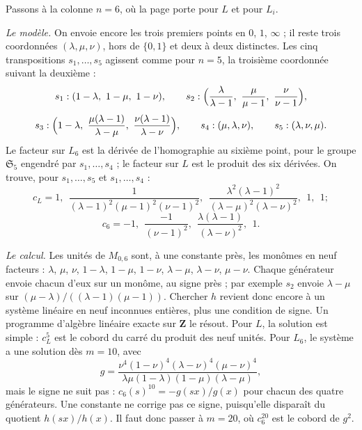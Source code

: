 Passons à la colonne $n = 6$, où la page porte  pour $L$ et  pour $L_i$.

\noindent\emph{Le modèle.} On envoie encore les trois premiers points en $0$, $1$, $\infty$ ; il reste trois coordonnées $(\lambda, \mu, \nu)$, hors de $\{0, 1\}$ et deux à deux distinctes. Les cinq transpositions $s_1, \ldots, s_5$ agissent comme pour $n = 5$, la troisième coordonnée suivant la deuxième :
\[
s_1 : (1 - \lambda,\ 1 - \mu,\ 1 - \nu), \qquad s_2 : \Bigl(\frac{\lambda}{\lambda - 1},\ \frac{\mu}{\mu - 1},\ \frac{\nu}{\nu - 1}\Bigr),
\]
\[
s_3 : \Bigl(1 - \lambda,\ \frac{\mu(\lambda - 1)}{\lambda - \mu},\ \frac{\nu(\lambda - 1)}{\lambda - \nu}\Bigr), \qquad s_4 : (\mu, \lambda, \nu), \qquad s_5 : (\lambda, \nu, \mu).
\] Le facteur sur $L_6$ est la dérivée de l'homographie au sixième point, pour le groupe $\mathfrak S_5$ engendré par $s_1, \ldots, s_4$ ; le facteur sur $L$ est le produit des six dérivées. On trouve, pour $s_1, \ldots, s_5$ et $s_1, \ldots, s_4$ :
\[
c_L = 1,\ \ \frac{1}{(\lambda - 1)^2(\mu - 1)^2(\nu - 1)^2},\ \ \frac{\lambda^2(\lambda - 1)^2}{(\lambda - \mu)^2(\lambda - \nu)^2},\ \ 1,\ \ 1 ;
\]
\[
c_6 = -1,\ \ \frac{-1}{(\nu - 1)^2},\ \ \frac{\lambda(\lambda - 1)}{(\lambda - \nu)^2},\ \ 1.
\]

\noindent\emph{Le calcul.} Les unités de $M_{0,6}$ sont, à une constante près, les monômes en neuf facteurs : $\lambda$, $\mu$, $\nu$, $1 - \lambda$, $1 - \mu$, $1 - \nu$, $\lambda - \mu$, $\lambda - \nu$, $\mu - \nu$. Chaque générateur envoie chacun d'eux sur un monôme, au signe près ; par exemple $s_2$ envoie $\lambda - \mu$ sur $(\mu - \lambda)/((\lambda - 1)(\mu - 1))$. Chercher $h$ revient donc encore à un système linéaire en neuf inconnues entières, plus une condition de signe. Un programme d'algèbre linéaire exacte sur $\mathbf Z$ le résout. Pour $L$, la solution est simple : $c_L^5$ est le cobord du carré du produit des neuf unités. Pour $L_6$, le système a une solution dès $m = 10$, avec
\[
g = \frac{\nu^4 (1 - \nu)^4 (\lambda - \nu)^4 (\mu - \nu)^4}{\lambda\mu(1 - \lambda)(1 - \mu)(\lambda - \mu)},
\]
mais le signe ne suit pas : $c_6(s)^{10} = -g(sx)/g(x)$ pour chacun des quatre générateurs. Une constante ne corrige pas ce signe, puisqu'elle disparaît du quotient $h(sx)/h(x)$. Il faut donc passer à $m = 20$, où $c_6^{20}$ est le cobord de $g^2$.

